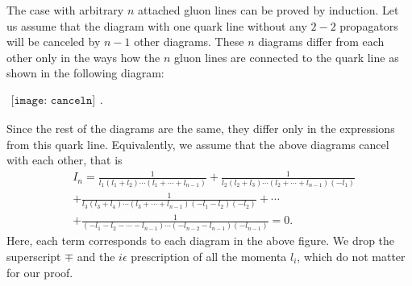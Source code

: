 \documentclass[onecolumn,showpacs,nobibnotes,nofootinbib,12pt,aps,prd,showpacs,notitlepage,nofootinbib,preprintnumbers,amsmath,amssymb]{article}
\begin{document}
The case with arbitrary $n$ attached gluon lines can be proved by
induction. Let us assume that the diagram with one quark line without
any $2-2$ propagators will be canceled by $n-1$ other diagrams. These
$n$ diagrams differ from each other only in the ways how the $n$ gluon
lines are connected to the quark line as shown in the following
diagram:
\begin{center}
  $
  \begin{array}{l}
    \texttt{[image: canceln]}
  \end{array}.
  $
\end{center}
Since the rest of the diagrams are the same, they differ only in the
expressions from this quark line. Equivalently, we assume that the
above diagrams cancel with each other, that is
\begin{align}\label{eq:cancel}
  &I_n=\frac{1}{l_1(l_1+l_2)\cdots (l_1+\cdots+l_{n-1})}+\frac{1}{l_2(l_2+l_3)\cdots (l_2+\cdots+l_{n-1})(-l_1)}\nonumber\\
  &+\frac{1}{l_3(l_3+l_4)\cdots (l_3+\cdots+l_{n-1})(-l_1-l_2)(-l_2)}+\cdots\nonumber\\
  &+\frac{1}{(-l_1-l_2-\cdots-l_{n-1})\cdots
    (-l_{n-2}-l_{n-1})(-l_{n-1})}=0.
\end{align}
Here, each term corresponds to each diagram in the above figure. We
drop the superscript $\mp$ and the $i\epsilon$ prescription of all the
momenta $l_i$, which do not matter for our proof.
\end{document}
